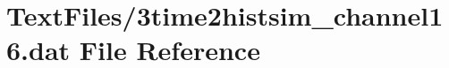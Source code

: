 \hypertarget{3time2histsim__channel16_8dat}{}\section{Text\+Files/3time2histsim\+\_\+channel16.dat File Reference}
\label{3time2histsim__channel16_8dat}
